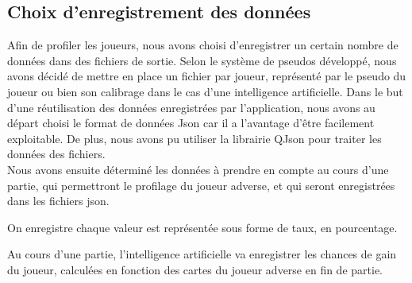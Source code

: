\documentclass{report}
\begin{document}
\subsection{Choix d'enregistrement des données}

\hspace{0.5cm}Afin de profiler les joueurs, nous avons choisi d'enregistrer un certain nombre de données dans des fichiers de sortie. Selon le système de pseudos développé, nous avons décidé de mettre en place un fichier par joueur, représenté par le pseudo du joueur ou bien son calibrage dans le cas d'une intelligence artificielle. Dans le but d'une réutilisation des données enregistrées par l'application, nous avons au départ choisi le format de données Json car il a l'avantage d'être facilement exploitable. De plus, nous avons pu utiliser la librairie QJson pour traiter les données des fichiers.\\

Nous avons ensuite déterminé les données à prendre en compte au cours d'une partie, qui permettront le profilage du joueur adverse, et qui seront enregistrées dans les fichiers json.\par
On enregistre chaque valeur est représentée sous forme de taux, en pourcentage.\par
Au cours d'une partie, l'intelligence artificielle va enregistrer les chances de gain du joueur, calculées en fonction des cartes du joueur adverse en fin de partie.\par
\end{document}
